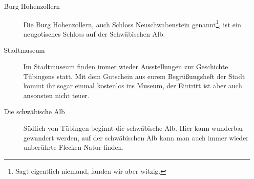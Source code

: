 \begin{description}
\item[Burg Hohenzollern]
Die Burg Hohenzollern, auch Schloss Neuschwabenstein genannt\footnote{Sagt eigentlich niemand, fanden wir aber witzig.}, ist ein neugotisches Schloss auf der Schwäbischen Alb.

\item[Stadtmuseum]
Im Stadtmuseum finden immer wieder Ausstellungen zur Geschichte Tübingens statt. Mit dem Gutschein aus eurem Begrüßungsheft der Stadt kommt ihr sogar einmal kostenlos ins Museum, der Eintritt ist aber auch ansonsten nicht teuer.

\item[Die schwäbische Alb]
Südlich von Tübingen beginnt die schwäbische Alb. Hier kann wunderbar gewandert werden, auf der schwäbischen Alb kann man auch immer wieder unberührte Flecken Natur finden.

\end{description}
